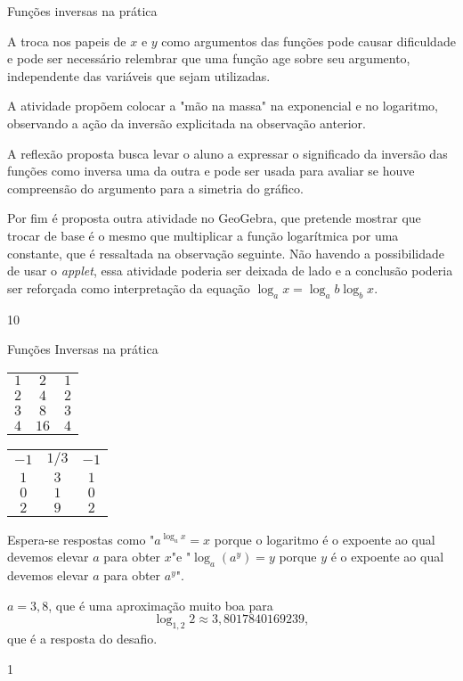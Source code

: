 \begin{sugestions}{Funções inversas na prática}
{
	A troca nos papeis de $x$ e $y$ como argumentos das funções pode causar dificuldade e pode ser necessário relembrar que uma função age sobre seu argumento, independente das variáveis que sejam utilizadas.

	A atividade propõem colocar a "mão na massa" na exponencial e no logaritmo, observando a ação da inversão explicitada na observação anterior.

	A reflexão proposta busca levar o aluno a expressar o significado da inversão das funções como inversa uma da outra e pode ser usada para avaliar se houve compreensão do argumento para a simetria do gráfico.

	Por fim é proposta outra atividade no GeoGebra, que pretende mostrar que trocar de base é o mesmo que multiplicar a função logarítmica por uma constante, que é ressaltada na observação seguinte. Não havendo a possibilidade de usar o \textit{applet}, essa atividade poderia ser deixada de lado e a conclusão poderia ser reforçada como interpretação da equação $\log_a x = \log_a b \log_b x$.
}{1}{0}
\end{sugestions}
\begin{answer}{Funções Inversas na prática}
{
	\begin{table}[H]
	\centering
	
	\begin{tabular}{|c|c|c|}
	\hline
	\tcolor{$\bm{x}$} & \tcolor{$\bm{y=2^x}$} & \tcolor{$\bm{{\log_2 x}}$} \\
	\hline
	$1$ & $2$ & $1$ \\
	\hline
	$2$ & $4$ & $2$ \\
	\hline
	$3$ & $8$ & $3$ \\
	\hline
	$4$ & $16$ & $4$ \\
	\hline
	\end{tabular}
	\hspace{2em}
	\begin{tabular}{|c|c|c|}
	\hline
	\tcolor{$\bm{y}$} & \tcolor{$\bm{x=3^y}$} & \tcolor{$\bm{{\log_3 x}}$} \tabularnewline
	\hline
	$-1$ & $1/3$ & $-1$ \\
	\hline
	$1$ & $3$ & $1$ \\
	\hline
	$0$ & $1$ & $0$ \\
	\hline
	$2$ & $9$ & $2$ \\
	\hline
	\end{tabular}
	\end{table}

	Espera-se respostas como "$a^{\log_a x}=x$ porque o logaritmo é o expoente ao qual devemos elevar $a$ para obter $x$"{}e "$\log_a (a^y)=y$ porque $y$ é o expoente ao qual devemos elevar $a$ para obter $a^y$".

	$a = 3{,}8$, que é uma aproximação muito boa para $$\log_{1{,}2}2 \approx 3{,}8017840169239,$$ que é a resposta do desafio.

}{1}
\end{answer}

